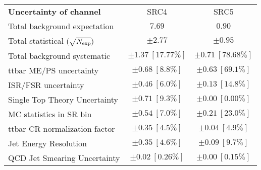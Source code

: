 \begin{table}
\begin{center}
\begin{tabular*}{\textwidth}{@{\extracolsep{\fill}}lcc}
\noalign{\smallskip}\hline\noalign{\smallskip}
{\bf Uncertainty of channel}                                    & SRC4            & SRC5            \\
\noalign{\smallskip}\hline\noalign{\smallskip}
Total background expectation             &  $7.69$        &  $0.90$       \\
\noalign{\smallskip}\hline\noalign{\smallskip}
Total statistical $(\sqrt{N_{\rm exp}})$              & $\pm 2.77$        & $\pm 0.95$       \\
Total background systematic               & $\pm 1.37\ [17.77\%] $        & $\pm 0.71\ [78.68\%] $             \\
\noalign{\smallskip}\hline\noalign{\smallskip}
\noalign{\smallskip}\hline\noalign{\smallskip}
ttbar ME/PS uncertainty        & $\pm 0.68\ [8.8\%] $          & $\pm 0.63\ [69.1\%] $       \\
ISR/FSR uncertainty        & $\pm 0.46\ [6.0\%] $          & $\pm 0.13\ [14.8\%] $       \\
Single Top Theory Uncertainty        & $\pm 0.71\ [9.3\%] $          & $\pm 0.00\ [0.00\%] $       \\
MC statistics in SR bin         & $\pm 0.54\ [7.0\%] $          & $\pm 0.21\ [23.0\%] $         \\
ttbar CR normalization factor         & $\pm 0.35\ [4.5\%] $          & $\pm 0.04\ [4.9\%] $       \\
Jet Energy Resolution        & $\pm 0.35\ [4.6\%] $          & $\pm 0.09\ [9.7\%] $       \\
QCD Jet Smearing Uncertainty        & $\pm 0.02\ [0.26\%] $          & $\pm 0.00\ [0.15\%] $       \\

\end{tabular*}
\end{center}
\end{table}
